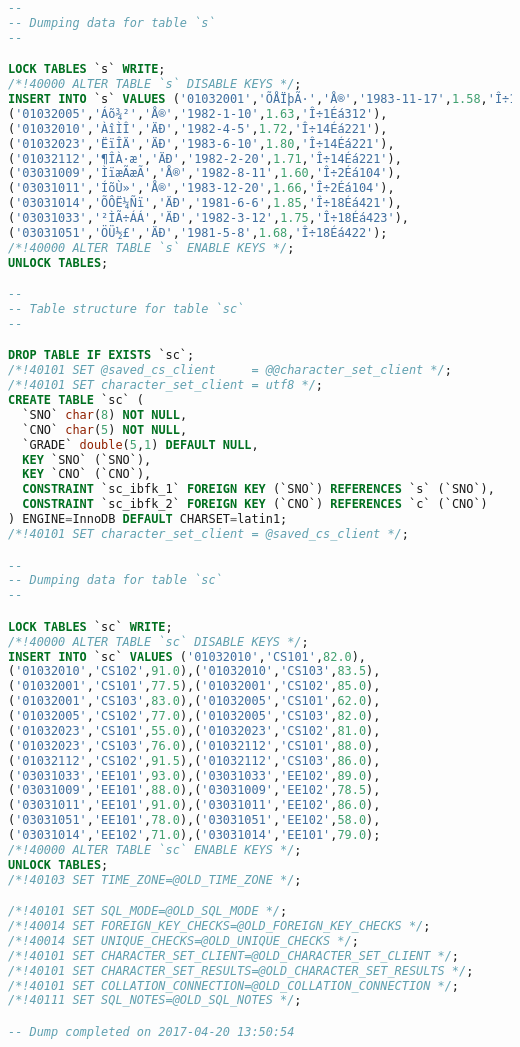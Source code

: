 \documentclass[UTF8]{ctexart}
\begin{document}
\begin{small}
\begin{lstlisting}[language=sql]
--
-- Dumping data for table `s`
--

LOCK TABLES `s` WRITE;
/*!40000 ALTER TABLE `s` DISABLE KEYS */;
INSERT INTO `s` VALUES ('01032001','ÕÅÏþÃ·','Å®','1983-11-17',1.58,'Î÷1Éá312'),
('01032005','Áõ¾²','Å®','1982-1-10',1.63,'Î÷1Éá312'),
('01032010','ÀîÌÎ','ÄÐ','1982-4-5',1.72,'Î÷14Éá221'),
('01032023','ËïÎÄ','ÄÐ','1983-6-10',1.80,'Î÷14Éá221'),
('01032112','¶­ÎÀ·æ','ÄÐ','1982-2-20',1.71,'Î÷14Éá221'),
('03031009','ÌïæÃæÃ','Å®','1982-8-11',1.60,'Î÷2Éá104'),
('03031011','ÍõÙ»','Å®','1983-12-20',1.66,'Î÷2Éá104'),
('03031014','ÕÔË¼Ñï','ÄÐ','1981-6-6',1.85,'Î÷18Éá421'),
('03031033','²ÌÃ÷ÁÁ','ÄÐ','1982-3-12',1.75,'Î÷18Éá423'),
('03031051','ÖÜ½£','ÄÐ','1981-5-8',1.68,'Î÷18Éá422');
/*!40000 ALTER TABLE `s` ENABLE KEYS */;
UNLOCK TABLES;

--
-- Table structure for table `sc`
--

DROP TABLE IF EXISTS `sc`;
/*!40101 SET @saved_cs_client     = @@character_set_client */;
/*!40101 SET character_set_client = utf8 */;
CREATE TABLE `sc` (
  `SNO` char(8) NOT NULL,
  `CNO` char(5) NOT NULL,
  `GRADE` double(5,1) DEFAULT NULL,
  KEY `SNO` (`SNO`),
  KEY `CNO` (`CNO`),
  CONSTRAINT `sc_ibfk_1` FOREIGN KEY (`SNO`) REFERENCES `s` (`SNO`),
  CONSTRAINT `sc_ibfk_2` FOREIGN KEY (`CNO`) REFERENCES `c` (`CNO`)
) ENGINE=InnoDB DEFAULT CHARSET=latin1;
/*!40101 SET character_set_client = @saved_cs_client */;

--
-- Dumping data for table `sc`
--

LOCK TABLES `sc` WRITE;
/*!40000 ALTER TABLE `sc` DISABLE KEYS */;
INSERT INTO `sc` VALUES ('01032010','CS101',82.0),
('01032010','CS102',91.0),('01032010','CS103',83.5),
('01032001','CS101',77.5),('01032001','CS102',85.0),
('01032001','CS103',83.0),('01032005','CS101',62.0),
('01032005','CS102',77.0),('01032005','CS103',82.0),
('01032023','CS101',55.0),('01032023','CS102',81.0),
('01032023','CS103',76.0),('01032112','CS101',88.0),
('01032112','CS102',91.5),('01032112','CS103',86.0),
('03031033','EE101',93.0),('03031033','EE102',89.0),
('03031009','EE101',88.0),('03031009','EE102',78.5),
('03031011','EE101',91.0),('03031011','EE102',86.0),
('03031051','EE101',78.0),('03031051','EE102',58.0),
('03031014','EE102',71.0),('03031014','EE101',79.0);
/*!40000 ALTER TABLE `sc` ENABLE KEYS */;
UNLOCK TABLES;
/*!40103 SET TIME_ZONE=@OLD_TIME_ZONE */;

/*!40101 SET SQL_MODE=@OLD_SQL_MODE */;
/*!40014 SET FOREIGN_KEY_CHECKS=@OLD_FOREIGN_KEY_CHECKS */;
/*!40014 SET UNIQUE_CHECKS=@OLD_UNIQUE_CHECKS */;
/*!40101 SET CHARACTER_SET_CLIENT=@OLD_CHARACTER_SET_CLIENT */;
/*!40101 SET CHARACTER_SET_RESULTS=@OLD_CHARACTER_SET_RESULTS */;
/*!40101 SET COLLATION_CONNECTION=@OLD_COLLATION_CONNECTION */;
/*!40111 SET SQL_NOTES=@OLD_SQL_NOTES */;

-- Dump completed on 2017-04-20 13:50:54
\end{lstlisting}
\end{small}
\end{document}
